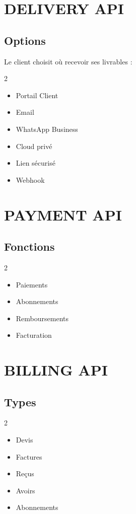 \documentclass[12pt,a4paper,oneside]{book}
\begin{document}
\chapter{DELIVERY API}

\section{Options}
Le client choisit où recevoir ses livrables :
\begin{multicols}{2}
\begin{itemize}
\item Portail Client
\item Email
\item WhatsApp Business
\item Cloud privé
\item Lien sécurisé
\item Webhook
\end{itemize}
\end{multicols}

\chapter{PAYMENT API}

\section{Fonctions}
\begin{multicols}{2}
\begin{itemize}
\item Paiements
\item Abonnements
\item Remboursements
\item Facturation
\end{itemize}
\end{multicols}

\chapter{BILLING API}

\section{Types}
\begin{multicols}{2}
\begin{itemize}
\item Devis
\item Factures
\item Reçus
\item Avoirs
\item Abonnements
\end{itemize}
\end{multicols}
\end{document}
